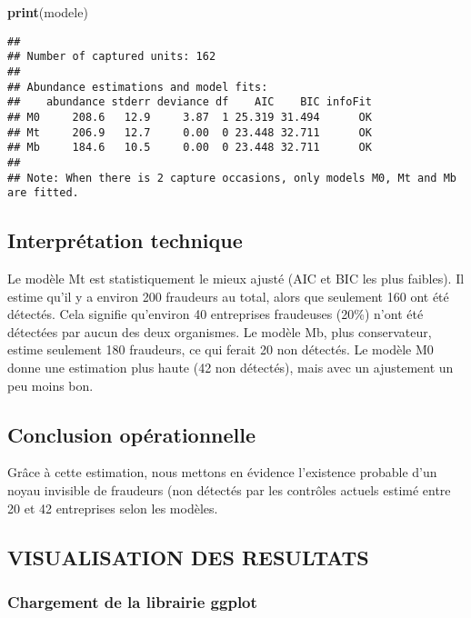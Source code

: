 \documentclass[
]{article}
\newenvironment{Shaded}{\begin{snugshade}}{\end{snugshade}}
\newcommand{\FunctionTok}[1]{\textcolor[rgb]{0.13,0.29,0.53}{\textbf{#1}}}
\newcommand{\NormalTok}[1]{#1}
\begin{document}
\begin{Shaded}
\begin{Highlighting}[]
\FunctionTok{print}\NormalTok{(modele)}
\end{Highlighting}
\end{Shaded}

\begin{verbatim}
## 
## Number of captured units: 162 
## 
## Abundance estimations and model fits:
##    abundance stderr deviance df    AIC    BIC infoFit
## M0     208.6   12.9     3.87  1 25.319 31.494      OK
## Mt     206.9   12.7     0.00  0 23.448 32.711      OK
## Mb     184.6   10.5     0.00  0 23.448 32.711      OK
## 
## Note: When there is 2 capture occasions, only models M0, Mt and Mb are fitted.
\end{verbatim}

\subsection{Interprétation technique}\label{interpruxe9tation-technique}

Le modèle Mt est statistiquement le mieux ajusté (AIC et BIC les plus
faibles). Il estime qu'il y a environ 200 fraudeurs au total, alors que
seulement 160 ont été détectés. Cela signifie qu'environ 40 entreprises
fraudeuses (20\%) n'ont été détectées par aucun des deux organismes. Le
modèle Mb, plus conservateur, estime seulement 180 fraudeurs, ce qui
ferait 20 non détectés. Le modèle M0 donne une estimation plus haute (42
non détectés), mais avec un ajustement un peu moins bon.

\subsection{Conclusion
opérationnelle}\label{conclusion-opuxe9rationnelle}

Grâce à cette estimation, nous mettons en évidence l'existence probable
d'un noyau invisible de fraudeurs (non détectés par les contrôles
actuels estimé entre 20 et 42 entreprises selon les modèles.

\subsection{VISUALISATION DES
RESULTATS}\label{visualisation-des-resultats}

\subsubsection{Chargement de la librairie
ggplot}\label{chargement-de-la-librairie-ggplot}
\end{document}
